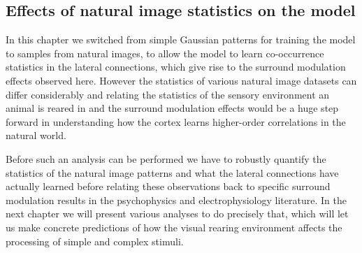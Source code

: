\subsection{Effects of natural image statistics on the model}

In this chapter we switched from simple Gaussian patterns for training
the model to samples from natural images, to allow the model to learn
co-occurrence statistics in the lateral connections, which give rise
to the surround modulation effects observed here. However the
statistics of various natural image datasets can differ considerably
and relating the statistics of the sensory environment an animal is
reared in and the surround modulation effects would be a huge step
forward in understanding how the cortex learns higher-order
correlations in the natural world.

Before such an analysis can be performed we have to robustly quantify
the statistics of the natural image patterns and what the lateral
connections have actually learned before relating these observations
back to specific surround modulation results in the psychophysics and
electrophysiology literature. In the next chapter we will present
various analyses to do precisely that, which will let us make concrete
predictions of how the visual rearing environment affects the
processing of simple and complex stimuli.
